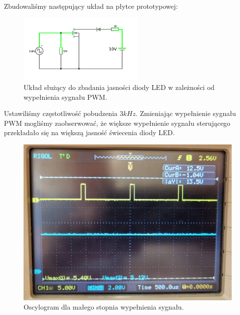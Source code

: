 \documentclass[polish,polish,a4paper]{article}
\begin{document}
Zbudowaliśmy następujący układ na płytce prototypowej:
\begin{figure}[H]
\centering
\includegraphics[width=0.55\textwidth]{nmos czas zalaczania.pdf}
\caption{Układ służący do zbadania jasności diody LED w zależności od wypełnienia sygnału PWM.}
\end{figure}

Ustawiliśmy częstotliwość pobudzenia $3 kHz$. Zmieniając wypełnienie sygnału PWM mogliśmy zaobserwować, że większe wypełnienie sygnału sterującego przekładało się na większą jasność świecenia diody LED.

\begin{figure}[H]
\centering
\includegraphics[width=1.0\textwidth]{oscylogram male wypelnienie.png}
\caption{Oscylogram dla małego stopnia wypełnienia sygnału.}
\end{figure}
\end{document}
